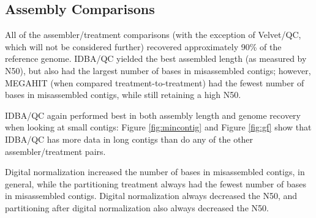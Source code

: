  



\subsection*{Assembly Comparisons}

All of the assembler/treatment comparisons (with the exception of
Velvet/QC, which will not be considered further) recovered
approximately 90\% of the reference genome.  IDBA/QC yielded the best
assembled length (as measured by N50), but also had the largest number
of bases in misassembled contigs; however, MEGAHIT (when compared
treatment-to-treatment) had the fewest number of bases in misassembled
contigs, while still retaining a high N50.

IDBA/QC again performed best in both assembly length and genome
recovery when looking at small contigs: Figure \ref{fig:mincontig} and Figure \ref{fig:gf} show
that IDBA/QC has more data in long contigs than do any of the other
assembler/treatment pairs.

Digital normalization increased the number of bases in misassembled
contigs, in general, while the partitioning treatment always had the
fewest number of bases in misassembled contigs.  Digital normalization
always decreased the N50, and partitioning after digital normalization
also always decreased the N50.

